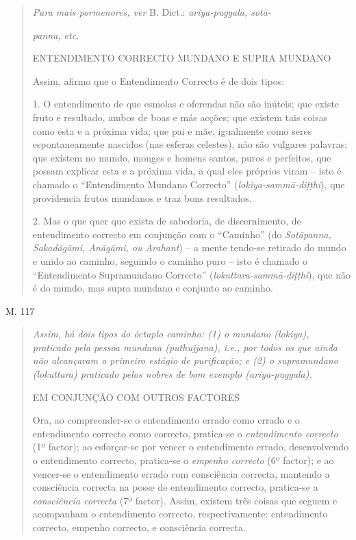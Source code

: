 \begin{quote}
\emph{Para mais pormenores, ver} B. Dict.: \emph{ariya-puggala, sotā-}

\emph{panna, etc.}

ENTENDIMENTO CORRECTO MUNDANO E SUPRA MUNDANO

Assim, afirmo que o Entendimento Correcto é de dois tipos:

1. O entendimento de que esmolas e oferendas não são inúteis; que existe fruto e resultado, ambos de boas e más acções; que existem tais coisas como esta e a próxima vida; que pai e mãe, igualmente como seres espontaneamente nascidos (nas esferas celestes), não são vulgares palavras; que existem no mundo, monges e homens santos, puros e perfeitos, que possam explicar esta e a próxima vida, a qual eles próprios viram -- isto é chamado o ``Entendimento Mundano Correcto'' (\emph{lokiya-sammā-diṭṭhi}), que providencia frutos mundanos e traz bons resultados.

2. Mas o que quer que exista de sabedoria, de discernimento, de entendimento correcto em conjunção com o ``Caminho'' (do \emph{Sotāpanna, Sakadāgāmi, Anāgāmi, ou Arahant}) -- a mente tendo-se retirado do mundo e unido ao caminho, seguindo o caminho puro -- isto é chamado o ``Entendimento Supramundano Correcto'' (\emph{lokuttara-sammā-diṭṭhi}), que não é do mundo, mas supra mundano e conjunto ao caminho.
\end{quote}

M. 117

\begin{quote}
\emph{Assim, há dois tipos do óctuplo caminho: (1) o mundano (lokiya), praticado pela pessoa mundana (puthujjana), i.e., por todos os que ainda não alcançaram o primeiro estágio de purificação; e (2) o supramundano (lokuttara) praticado pelos nobres de bom exemplo (ariya-puggala).}

EM CONJUNÇÃO COM OUTROS FACTORES

Ora, ao compreender-se o entendimento errado como errado e o entendimento correcto como correcto, pratica-se o \emph{entendimento correcto} (1º factor); ao esforçar-se por vencer o entendimento errado, desenvolvendo o entendimento correcto, pratica-se o \emph{empenho correcto} (6º factor); e ao vencer-se o entendimento errado com consciência correcta, mantendo a consciência correcta na posse de entendimento correcto, pratica-se a \emph{consciência correcta} (7º factor). Assim, existem três coisas que seguem e acompanham o entendimento correcto, respectivamente: entendimento correcto, empenho correcto, e consciência correcta.
\end{quote}

